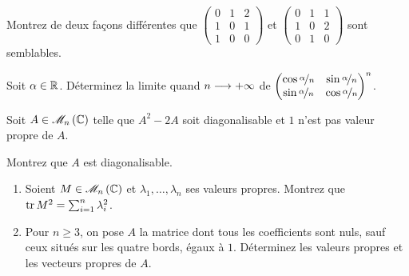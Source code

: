 \begin{corr}
\end{corr}

\begin{exo}
Montrez de deux façons différentes que \(\begin{pmatrix}
0 & 1 & 2 \\
1 & 0 & 1 \\
1 & 0 & 0
\end{pmatrix}\) et \(\begin{pmatrix}
0 & 1 & 1 \\
1 & 0 & 2 \\
0 & 1 & 0
\end{pmatrix}\) sont semblables.
\end{exo}

\begin{corr}
\end{corr}

\begin{exo}
Soit \(\alpha\in\mathbb{R}\). Déterminez la limite quand \(n\longrightarrow+\infty\) de \(\begin{pmatrix}
\cos\nicefrac{\alpha}{n} & \sin\nicefrac{\alpha}{n} \\
\sin\nicefrac{\alpha}{n} & \cos\nicefrac{\alpha}{n}
\end{pmatrix}^n\).
\end{exo}

\begin{corr}
\end{corr}

\begin{exo}
Soit \(A\in\M{n}[\C]\) telle que \(A^2-2A\) soit diagonalisable et \(1\) n'est pas valeur propre de \(A\).

Montrez que \(A\) est diagonalisable.
\end{exo}

\begin{corr}
\end{corr}

\begin{exo}
\begin{enumerate}
    \item Soient \(M\in\M{n}[\C]\) et \(\lambda_1,\dots,\lambda_n\) ses valeurs propres. Montrez que \(\operatorname{tr} M^2=\sum_{i=1}^n\lambda_i^2\). \\
    \item Pour \(n\geq3\), on pose \(A\) la matrice dont tous les coefficients sont nuls, sauf ceux situés sur les quatre bords, égaux à \(1\). Déterminez les valeurs propres et les vecteurs propres de \(A\).
\end{enumerate}
\end{exo}

